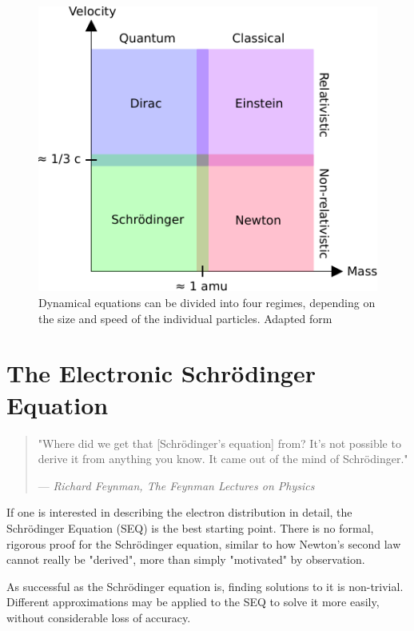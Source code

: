 \begin{figure}
\centering
\includegraphics[scale=1.0]{Pics/dyneq}
\caption{Dynamical equations can be divided into four regimes, depending on the size and speed of the individual particles. Adapted form \cite{Jen2017}}
\label{fig:REGIMES}
\end{figure}

\section{The Electronic Schrödinger Equation}

\begin{quote}
  "Where did we get that [Schrödinger's equation] from? It's not possible to derive it from anything you know. It came out of the mind of Schrödinger."
  \begin{flushright}
    \small{--- \textit{Richard Feynman, The Feynman Lectures on Physics}}
  \end{flushright}
\end{quote}

If one is interested in describing the electron distribution in detail, the Schrödinger Equation (SEQ) is the best starting point. There is no formal, rigorous proof for the Schrödinger equation, similar to how Newton's second law cannot really be "derived", more than simply "motivated" by observation. 

As successful as the Schrödinger equation is, finding solutions to it is non-trivial. Different approximations may be applied to the SEQ to solve it more easily, without considerable loss of accuracy. 

